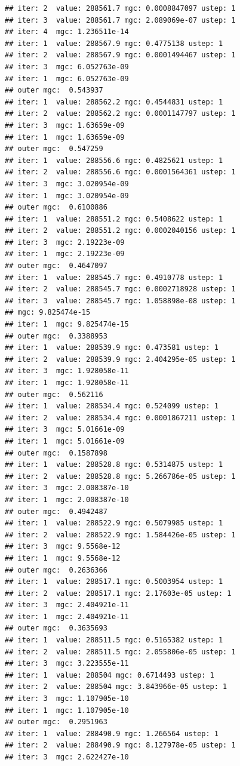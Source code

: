 \documentclass{article}\usepackage[]{graphicx}\usepackage[]{xcolor}
\makeatletter
\newenvironment{kframe}{%
 \def\at@end@of@kframe{}%
 \ifinner\ifhmode%
  \def\at@end@of@kframe{\end{minipage}}%
  \begin{minipage}{\columnwidth}%
 \fi\fi%
 \def\FrameCommand##1{\hskip\@totalleftmargin \hskip-\fboxsep
 \colorbox{shadecolor}{##1}\hskip-\fboxsep
     \hskip-\linewidth \hskip-\@totalleftmargin \hskip\columnwidth}%
 \MakeFramed {\advance\hsize-\width
   \@totalleftmargin\z@ \linewidth\hsize
   \@setminipage}}%
 {\par\unskip\endMakeFramed%
 \at@end@of@kframe}
\newenvironment{knitrout}{}{} %
\makeatother
\begin{document}
\begin{knitrout}
\begin{kframe}
\begin{verbatim}
## iter: 2  value: 288561.7 mgc: 0.0008847097 ustep: 1 
## iter: 3  value: 288561.7 mgc: 2.089069e-07 ustep: 1 
## iter: 4  mgc: 1.236511e-14 
## iter: 1  value: 288567.9 mgc: 0.4775138 ustep: 1 
## iter: 2  value: 288567.9 mgc: 0.0001494467 ustep: 1 
## iter: 3  mgc: 6.052763e-09 
## iter: 1  mgc: 6.052763e-09 
## outer mgc:  0.543937 
## iter: 1  value: 288562.2 mgc: 0.4544831 ustep: 1 
## iter: 2  value: 288562.2 mgc: 0.0001147797 ustep: 1 
## iter: 3  mgc: 1.63659e-09 
## iter: 1  mgc: 1.63659e-09 
## outer mgc:  0.547259 
## iter: 1  value: 288556.6 mgc: 0.4825621 ustep: 1 
## iter: 2  value: 288556.6 mgc: 0.0001564361 ustep: 1 
## iter: 3  mgc: 3.020954e-09 
## iter: 1  mgc: 3.020954e-09 
## outer mgc:  0.6100886 
## iter: 1  value: 288551.2 mgc: 0.5408622 ustep: 1 
## iter: 2  value: 288551.2 mgc: 0.0002040156 ustep: 1 
## iter: 3  mgc: 2.19223e-09 
## iter: 1  mgc: 2.19223e-09 
## outer mgc:  0.4647097 
## iter: 1  value: 288545.7 mgc: 0.4910778 ustep: 1 
## iter: 2  value: 288545.7 mgc: 0.0002718928 ustep: 1 
## iter: 3  value: 288545.7 mgc: 1.058898e-08 ustep: 1 
## mgc: 9.825474e-15 
## iter: 1  mgc: 9.825474e-15 
## outer mgc:  0.3388953 
## iter: 1  value: 288539.9 mgc: 0.473581 ustep: 1 
## iter: 2  value: 288539.9 mgc: 2.404295e-05 ustep: 1 
## iter: 3  mgc: 1.928058e-11 
## iter: 1  mgc: 1.928058e-11 
## outer mgc:  0.562116 
## iter: 1  value: 288534.4 mgc: 0.524099 ustep: 1 
## iter: 2  value: 288534.4 mgc: 0.0001867211 ustep: 1 
## iter: 3  mgc: 5.01661e-09 
## iter: 1  mgc: 5.01661e-09 
## outer mgc:  0.1587898 
## iter: 1  value: 288528.8 mgc: 0.5314875 ustep: 1 
## iter: 2  value: 288528.8 mgc: 5.266786e-05 ustep: 1 
## iter: 3  mgc: 2.008387e-10 
## iter: 1  mgc: 2.008387e-10 
## outer mgc:  0.4942487 
## iter: 1  value: 288522.9 mgc: 0.5079985 ustep: 1 
## iter: 2  value: 288522.9 mgc: 1.584426e-05 ustep: 1 
## iter: 3  mgc: 9.5568e-12 
## iter: 1  mgc: 9.5568e-12 
## outer mgc:  0.2636366 
## iter: 1  value: 288517.1 mgc: 0.5003954 ustep: 1 
## iter: 2  value: 288517.1 mgc: 2.17603e-05 ustep: 1 
## iter: 3  mgc: 2.404921e-11 
## iter: 1  mgc: 2.404921e-11 
## outer mgc:  0.3635693 
## iter: 1  value: 288511.5 mgc: 0.5165382 ustep: 1 
## iter: 2  value: 288511.5 mgc: 2.055806e-05 ustep: 1 
## iter: 3  mgc: 3.223555e-11 
## iter: 1  value: 288504 mgc: 0.6714493 ustep: 1 
## iter: 2  value: 288504 mgc: 3.843966e-05 ustep: 1 
## iter: 3  mgc: 1.107905e-10 
## iter: 1  mgc: 1.107905e-10 
## outer mgc:  0.2951963 
## iter: 1  value: 288490.9 mgc: 1.266564 ustep: 1 
## iter: 2  value: 288490.9 mgc: 8.127978e-05 ustep: 1 
## iter: 3  mgc: 2.622427e-10 

\end{verbatim}
\end{kframe}
\end{knitrout}
\end{document}
